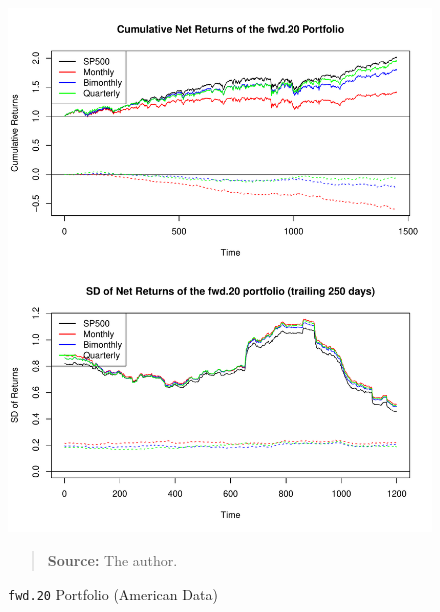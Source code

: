 \documentclass[preprint, doubleblind, authoryear,10pt]{elsarticle}
\begin{document}
\begin{figure}[htpb]
\centering
\footnotesize
\caption{\texttt{fwd.20} Portfolio (American Data)}
\label{fig:spy:fwd.20}
\includegraphics[width=.95\linewidth]{./figs/SP500-retac-fwd-20.pdf}
\begin{quote}
\textbf{Source:} The author.
\end{quote}
\end{figure}
\end{document}

